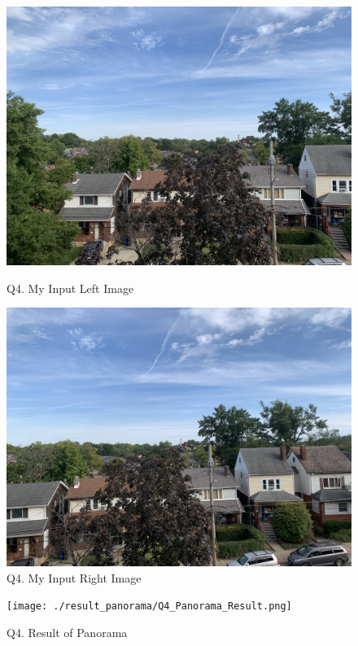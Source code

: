 \documentclass{article}
\begin{document}
	\begin{figure}[H]
	\centering
	\begin{minipage}[b]{0.45\textwidth}
		\centering
		\includegraphics[width=\textwidth]{./data/my_pano_left.jpg}  %
		\caption{Q4. My Input Left Image}
		\label{fig:Q4_input_left_img}
	\end{minipage}
	\hfill  %
	\begin{minipage}[b]{0.45\textwidth}
		\centering
		\includegraphics[width=\textwidth]{./data/my_pano_right.jpg}  %
		\caption{Q4. My Input Right Image}
		\label{fig:Q4_input_right_img}
	\end{minipage}
	\end{figure}
	\begin{figure}[H]
		\centering
		\texttt{[image: ./result\_panorama/Q4\_Panorama\_Result.png]}  %
		\caption{Q4. Result of Panorama}
		\label{fig:Q4_result_pano}
	\end{figure}	
\end{document}
